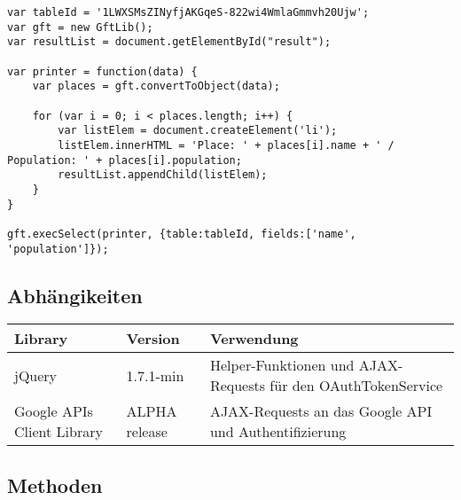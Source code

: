 \lstset{language=JavaScript}
\begin{lstlisting}
var tableId = '1LWXSMsZINyfjAKGqeS-822wi4WmlaGmmvh20Ujw';
var gft = new GftLib();
var resultList = document.getElementById("result");

var printer = function(data) {
	var places = gft.convertToObject(data);

	for (var i = 0; i < places.length; i++) {
		var listElem = document.createElement('li');
		listElem.innerHTML = 'Place: ' + places[i].name + ' / Population: ' + places[i].population;
		resultList.appendChild(listElem);
	}
}

gft.execSelect(printer, {table:tableId, fields:['name', 'population']});
\end{lstlisting}

\subsection{Abhängikeiten}
\begin{longtable}{|l|p{2cm}|p{7cm}|}
\hline 
\textbf{Library} & \textbf{Version} & \textbf{Verwendung} \\ 
\hline 
jQuery & 1.7.1-min & Helper-Funktionen und \gls{AJAX}-Requests für den OAuthTokenService  \\ 
\hline 
Google APIs Client Library & ALPHA release & \gls{AJAX}-Requests an das Google API und Authentifizierung \\ 
\hline 
\end{longtable} 

\subsection{Methoden}
